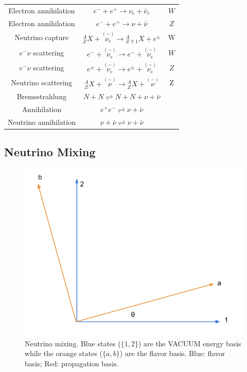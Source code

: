 \documentclass{sciposter}
\begin{document}
\begin{multicols}{3}
\begin{table}[ht]
\begin{tabular}{|c | c | c|}
 Electron annihilation &  $e^- + e^+  \to \nu_e + \bar\nu_e $  & $W$ \\
 Electron annihilation &  $e^- + e^+  \to \nu + \bar\nu $  & $Z$ \\
 [0.5ex]
 \hline

  Neutrino capture & ${}^A_{Z}X + \overset{(-)}{\nu_e} \to {}^A_{Z\mp 1}X + e^\pm $ & W\\
  [1ex]
 \hline
 $e^-\nu$ scattering & $e^- + \overset{(-)}{\nu_e} \to e^- + \overset{(-)}{\nu_e} $ &  $W$ \\
 $e^-\nu$ scattering & $e^{\pm} + \overset{(-)}{\nu_e} \to e^{\pm} + \overset{(-)}{\nu_e} $ &  $Z$ \\
 Neutrino scattering & $ {}^A_Z X + \overset{(-)}{\nu} \to {}^A_Z X + \overset{(-)}{\nu} $ &  Z\\
 [0.5ex]
 \hline

 Bremsstrahlung & $N+N\rightleftharpoons N+N + \nu + \bar\nu$ & \\
 Annihilation & $e^+e^- \rightleftharpoons \nu + \bar \nu$   & \\
 Neutrino annihilation & $\nu + \bar \nu  \rightleftharpoons \nu + \bar \nu $   &  \\
 [0.5ex]
 \hline
 \end{tabular}
\label{table:Neutrino_Reactions}
\end{table}



\subsection{Neutrino Mixing}

\begin{figure}
\centering
\includegraphics[width=\columnwidth]{assets/neutrinoMixingAngle.png}
\caption{Neutrino mixing. Blue states ($\{1,2\}$) are the VACUUM energy basis while the orange states ($\{a,b\}$) are the flavor basis. Blue: flavor basis; Red: propagation basis.}
\label{fig:neutrinoMixingAngle}
\end{figure}


\end{multicols}
\end{document}
